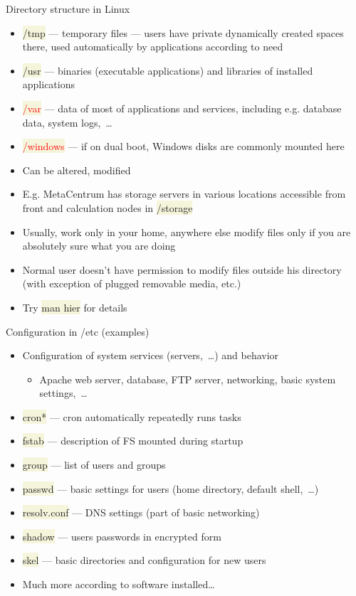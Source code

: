 \documentclass[compress, ucs, xelatex, 11pt, xcolor=svgnames, aspectratio=169,
	hyperref={
		bookmarks=true,
		unicode=true,
		colorlinks=true,
		pdftitle={Linux, command line and MetaCentrum},
		plainpages=false,
		pdfauthor={Vojtech Zeisek},
		pdfsubject={Course about use of Linux command line, writing shell scripts and using MetaCentrum of CESNET},
		pdfcreator={XeLaTeX},
		pdfkeywords={Linux, GNU, BASH, shell, command line, MetaCentrum},
		linkcolor=DarkRed, %
		anchorcolor=DarkBlue, %
		citecolor=Indigo, %
		filecolor=NavyBlue, %
		menucolor=DarkMagenta, %
		urlcolor=DarkBlue, %
		pdftex},
	url={hyphens, lowtilde} %
	]{beamer}
\renewcommand{\texttt}[1]{\colorbox{Beige}{{\ttfamily #1}}}
\renewcommand{\alert}[1]{\textcolor{red}{#1}}
\begin{document}
\begin{frame}[allowframebreaks]{Directory structure in Linux}
\begin{itemize}
		\item \texttt{/tmp} --- temporary files --- users have private dynamically created spaces there, used automatically by applications according to need
		\item \texttt{/usr} --- binaries (executable applications) and libraries of installed applications
		\item \alert{\texttt{/var}} --- data of most of applications and services, including e.g. database data, system logs,~\ldots
		\item \alert{\texttt{/windows}} --- if on dual boot, Windows disks are commonly mounted here
		\item Can be altered, modified
		\item E.g. MetaCentrum has storage servers in various locations accessible from front and calculation nodes in \texttt{/storage}
		\item Usually, work only in your home, anywhere else modify files only if you are absolutely sure what you are doing
		\item Normal user doesn't have permission to modify files outside his directory (with exception of plugged removable media, etc.)
		\item Try \texttt{man hier} for details
	\end{itemize}
\end{frame}

\begin{frame}{Configuration in /etc (examples)}
	\begin{itemize}
		\item Configuration of system services (servers,~\ldots) and behavior
		\begin{itemize}
			\item Apache web server, database, FTP server, networking, basic system settings,~\ldots
		\end{itemize}
		\item \texttt{cron*} --- cron automatically repeatedly runs tasks
		\item \texttt{fstab} --- description of FS mounted during startup
		\item \texttt{group} --- list of users and groups
		\item \texttt{passwd} --- basic settings for users (home directory, default shell,~\ldots)
		\item \texttt{resolv.conf} ---  DNS settings (part of basic networking)
		\item \texttt{shadow} --- users passwords in encrypted form
		\item \texttt{skel} --- basic directories and configuration for new users
		\item Much more according to software installed\ldots
	\end{itemize}
\end{frame}
\end{document}
